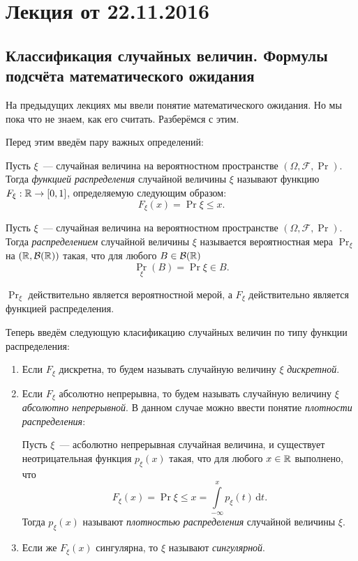 \section{Лекция от 22.11.2016}
\subsection{Классификация случайных величин. Формулы подсчёта математического ожидания}
На предыдущих лекциях мы ввели понятие математического ожидания. Но мы пока что не знаем, как его считать. Разберёмся с этим.

Перед этим введём пару важных определений:
\begin{definition}
	Пусть \(\xi\)~--- случайная величина на вероятностном пространстве \((\Omega, \mathcal{F}, \Pr)\). Тогда \emph{функцией распределения} случайной величины \(\xi\) называют функцию \(F_{\xi} : \mathbb{R} \to [0, 1]\), определяемую следующим образом:
	\[
	F_{\xi}(x) = \Pr{\xi \leq x}.
	\]
\end{definition}
\begin{definition}
	Пусть \(\xi\)~--- случайная величина на вероятностном пространстве \((\Omega, \mathcal{F}, \Pr)\). Тогда \emph{распределением} случайной величины \(\xi\) называется вероятностная мера \(\Pr_{\xi}\) на \((\mathbb{R}, \mathcal{B}(\mathbb{R}))\) такая, что для любого \(B \in \mathcal{B}(\mathbb{R})\)
	\[
	\Pr_{\xi}(B) = \Pr{\xi \in B}.
	\]
\end{definition}
\begin{remark}
	\(\Pr_{\xi}\) действительно является вероятностной мерой, а \(F_{\xi}\) действительно является функцией распределения.
\end{remark}

Теперь введём следующую класификацию случайных величин по типу функции распределения:
\begin{enumerate}
	\item Если \(F_{\xi}\) дискретна, то будем называть случайную величину \(\xi\) \emph{дискретной}.
	
	\item Если \(F_{\xi}\) абсолютно непрерывна, то будем называть случайную величину \(\xi\) \emph{абсолютно непрерывной}. В данном случае можно ввести понятие \emph{плотности распределения}:
	\begin{definition}
		Пусть \(\xi\)~--- асболютно непрерывная случайная величина, и существует неотрицательная функция \(p_{\xi}(x)\) такая, что для любого \(x \in \mathbb{R}\) выполнено, что
		\[
		F_{\xi}(x) = \Pr{\xi \leq x} = \int\limits_{-\infty}^{x}p_{\xi}(t)\,\mathrm{d}t.
		\]
		Тогда \(p_{\xi}(x)\) называют \emph{плотностью распределения} случайной величины \(\xi\).
	\end{definition}

	\item Если же \(F_{\xi}(x)\) сингулярна, то \(\xi\) называют \emph{сингулярной}.
\end{enumerate}

